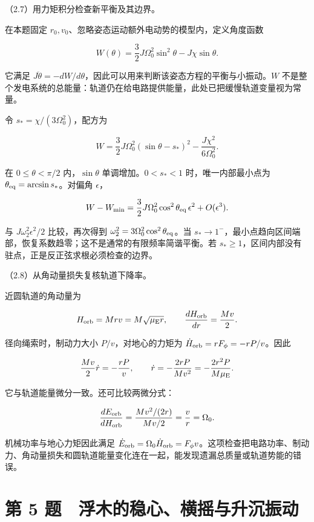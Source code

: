 \documentclass[12pt,a4paper,fontset=fandol]{ctexart}
\begin{document}
（2.7）用力矩积分检查新平衡及其边界。

在本题固定 \(r_0,v_0\)、忽略姿态运动额外电动势的模型内，定义角度函数

\[
W(\theta)=\frac32J\Omega_0^2\sin^2\theta-J\chi\sin\theta.
\]

它满足
\(J\ddot\theta=-dW/d\theta\)，因此可以用来判断该姿态方程的平衡与小振动。\(W\)
不是整个发电系统的总能量：轨道仍在给电路提供能量，此处已把缓慢轨道变量视为常量。

令 \(s_*=\chi/(3\Omega_0^2)\)，配方为

\[
W=\frac32J\Omega_0^2(\sin\theta-s_*)^2
-\frac{J\chi^2}{6\Omega_0^2}.
\]

在 \(0\le\theta<\pi/2\) 内，\(\sin\theta\) 单调增加。\(0<s_*<1\)
时，唯一内部最小点为 \(\theta_{\rm eq}=\arcsin s_*\)。对偏角
\(\epsilon\)，

\[
W-W_{\min}
=\frac32J\Omega_0^2\cos^2\theta_{\rm eq}\,\epsilon^2
+O(\epsilon^3).
\]

与 \(J\omega_2^2\epsilon^2/2\) 比较，再次得到
\(\omega_2^2=3\Omega_0^2\cos^2\theta_{\rm eq}\)。当
\(s_*\to1^-\)，最小点趋向区间端部，恢复系数趋零；这不是通常的有限频率简谐平衡。若
\(s_*\ge1\)，区间内部没有驻点，正是反正弦求根必须检查的边界。

\par\noindent\begin{minipage}{\linewidth}
\setlength{\parindent}{2em}\setlength{\parskip}{.35em}
（2.8）从角动量损失复核轨道下降率。

近圆轨道的角动量为

\[
H_{\rm orb}=Mr v=M\sqrt{\mu_{\rm E}r},\qquad
\frac{dH_{\rm orb}}{dr}=\frac{Mv}{2}.
\]

径向绳索时，制动力大小 \(P/v\)，对地心的力矩为
\(\dot H_{\rm orb}=rF_\phi=-rP/v\)。因此

\[
\frac{Mv}{2}\dot r=-\frac{rP}{v},\qquad
\dot r=-\frac{2rP}{Mv^2}
=-\frac{2r^2P}{M\mu_{\rm E}}.
\]

它与轨道能量微分一致。还可比较两微分式：

\[
\frac{dE_{\rm orb}}{dH_{\rm orb}}
=\frac{Mv^2/(2r)}{Mv/2}=\frac vr=\Omega_0.
\]

机械功率与地心力矩因此满足
\(\dot E_{\rm orb}=\Omega_0\dot H_{\rm orb}=F_\phi v\)。这项检查把电路功率、制动力、角动量损失和圆轨道能量变化连在一起，能发现遗漏总质量或轨道势能的错误。


\end{minipage}\par
\clearpage

\section{第 5
题　浮木的稳心、横摇与升沉振动}\label{ux7b2c-5-ux9898-ux6d6eux6728ux7684ux7a33ux5fc3ux6a2aux6447ux4e0eux5347ux6c89ux632fux52a8}
\end{document}
